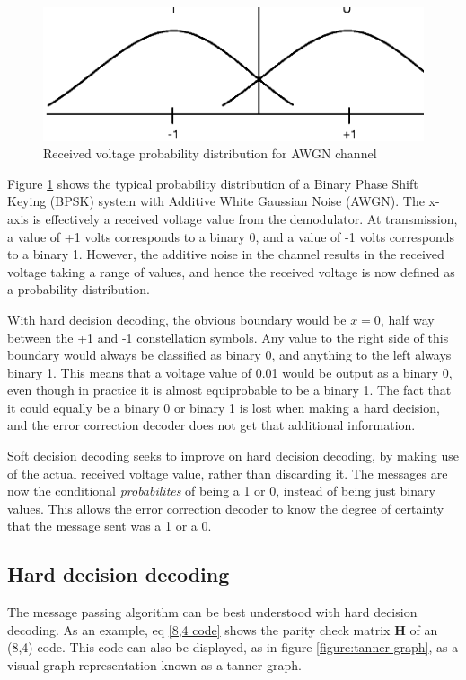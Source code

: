 \documentclass[11pt]{article}
\numberwithin{equation}{subsection}
\begin{document}
\begin{figure}[h]
\centering
\includegraphics{BPSK_channel_graph}
\caption{Received voltage probability distribution for AWGN channel}
\label{figure:awgn probability graph}
\end{figure}

Figure \ref{figure:awgn probability graph} shows the typical probability distribution of a Binary Phase Shift Keying (BPSK) system with Additive White Gaussian Noise (AWGN). The x-axis is effectively a received voltage value from the demodulator. At transmission, a value of +1 volts corresponds to a binary 0, and a value of -1 volts corresponds to a binary 1. However, the additive noise in the channel results in the received voltage taking a range of values, and hence the received voltage is now defined as a probability distribution.

With hard decision decoding, the obvious boundary would be $x = 0$, half way between the +1 and -1 constellation symbols. Any value to the right side of this boundary would always be classified as binary 0, and anything to the left always binary 1. This means that a voltage value of 0.01 would be output as a binary 0, even though in practice it is almost equiprobable to be a binary 1. The fact that it could equally be a binary 0 or binary 1 is lost when making a hard decision, and the error correction decoder does not get that additional information.

Soft decision decoding seeks to improve on hard decision decoding, by making use of the actual received voltage value, rather than discarding it. The messages are now the conditional \textit{probabilites} of being a 1 or 0, instead of being just binary values. This allows the error correction decoder to know the degree of certainty that the message sent was a 1 or a 0.

\subsection{Hard decision decoding}
The message passing algorithm can be best understood with hard decision decoding. As an example, eq \ref{8,4 code} shows the parity check matrix $\mathbf{H}$ of an (8,4) code. This code can also be displayed, as in figure \ref{figure:tanner graph}, as a visual graph representation known as a tanner graph. \cite{leiner2005ldpc}
\end{document}
